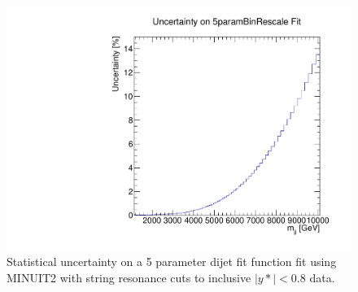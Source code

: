 
\begin{figure}
    \centering
    \includegraphics[width=1\linewidth]{figures/app-GlobalFitStudies/5ParamGlobalFit_ystar0p8_Uncertainty.pdf}
    \caption{Statistical uncertainty on a 5 parameter dijet fit function fit using MINUIT2 with string resonance cuts to inclusive $|y*|<0.8$ data.}
    \label{fig:BinningShapeAdjustment}
\end{figure}



